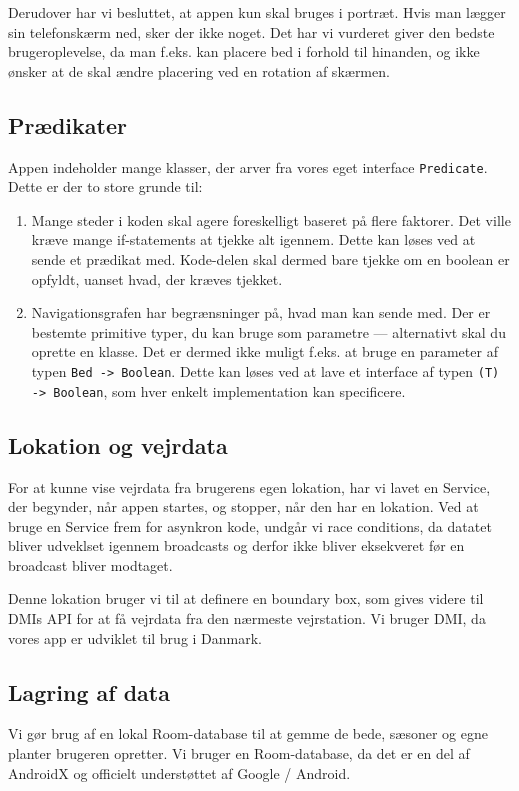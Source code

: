 Derudover har vi besluttet, at appen kun skal bruges i portræt. Hvis man lægger sin telefonskærm ned, sker der ikke noget. Det har vi vurderet giver den bedste brugeroplevelse, da man f.eks. kan placere bed i forhold til hinanden, og ikke ønsker at de skal ændre placering ved en rotation af skærmen. 

\subsection{Prædikater}
Appen indeholder mange klasser, der arver fra vores eget interface \texttt{Predicate}. Dette er der to store grunde til:

\begin{enumerate}
    \item Mange steder i koden skal agere foreskelligt baseret på flere faktorer. Det ville kræve mange if-statements at tjekke alt igennem. Dette kan løses ved at sende et prædikat med. Kode-delen skal dermed bare tjekke om en boolean er opfyldt, uanset hvad, der kræves tjekket.
    \item Navigationsgrafen har begrænsninger på, hvad man kan sende med. Der er bestemte primitive typer, du kan bruge som parametre --- alternativt skal du oprette en klasse. Det er dermed ikke muligt f.eks. at bruge en parameter af typen \texttt{Bed -> Boolean}. Dette kan løses ved at lave et interface af typen \texttt{(T) -> Boolean}, som hver enkelt implementation kan specificere.
    
\end{enumerate}

\subsection{Lokation og vejrdata}
For at kunne vise vejrdata fra brugerens egen lokation, har vi lavet en Service, der begynder, når appen startes, og stopper, når den har en lokation. Ved at bruge en Service frem for asynkron kode, undgår vi race conditions, da datatet bliver udveklset igennem broadcasts og derfor ikke bliver eksekveret før en broadcast bliver modtaget.

Denne lokation bruger vi til at definere en boundary box, som gives videre til DMIs API for at få vejrdata fra den nærmeste vejrstation. Vi bruger DMI, da vores app er udviklet til brug i Danmark. 

\subsection{Lagring af data}
Vi gør brug af en lokal Room-database til at gemme de bede, sæsoner og egne planter brugeren opretter. Vi bruger en Room-database, da det er en del af AndroidX og officielt understøttet af Google / Android. 

